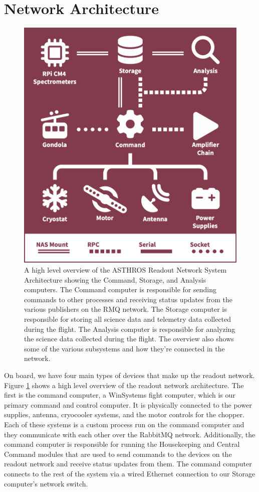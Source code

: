 \section{Network Architecture}
\begin{figure}
    \centering
    \includegraphics[width=0.5\linewidth]{figs/spectra/system.png}
    \caption[High Level System Diagram for ASTHROS]{A high level overview of the ASTHROS Readout Network System Architecture showing the Command, Storage, and Analysis computers. The Command computer is responsible for sending commands to other processes and receiving status updates from the various publishers on the RMQ network. The Storage computer is responsible for storing all science data and telemetry data collected during the flight. The Analysis computer is responsible for analyzing the science data collected during the flight. The overview also shows some of the various subsystems and how they're connected in the network.}
    \label{readout/fig:system}
\end{figure}

On board, we have four main types of devices that make up the readout network.
Figure \ref{readout/fig:system} shows a high level overview of the readout network architecture.
The first is the command computer, a WinSystems fight computer, which is our primary command and control computer.
It is physically connected to the power supplies, antenna, cryocooler systems, and the motor controls for the chopper.
Each of these systems is a custom process run on the command computer and they communicate with each other over the RabbitMQ network.
Additionally, the command computer is responsible for running the Housekeeping and Central Command modules that are used to send commands to the devices on the readout network and receive status updates from them.
The command computer connects to the rest of the system via a wired Ethernet connection to our Storage computer's network switch.

